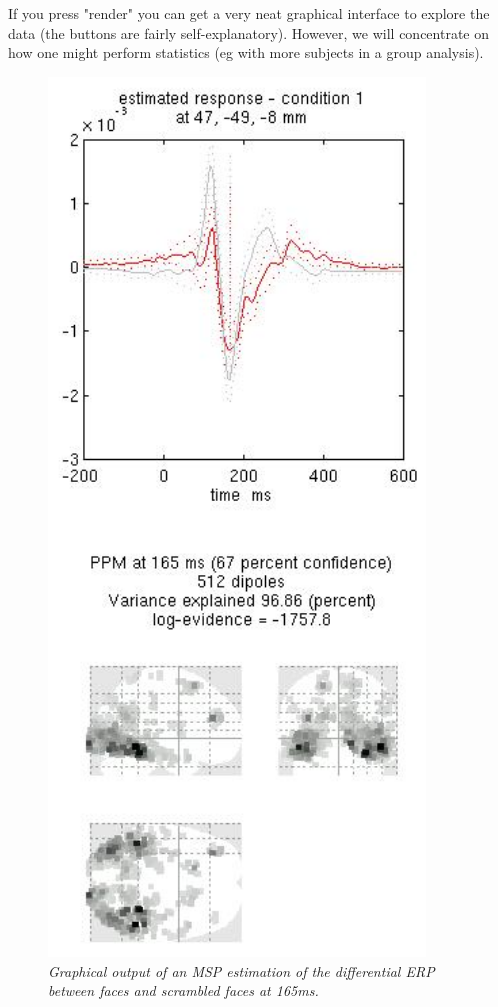 If you press "render" you can get a very neat graphical interface to explore the data (the buttons are fairly self-explanatory). However, we will concentrate on how one might perform statistics (eg with more subjects in a group analysis).


\begin{figure}
\begin{center}
\includegraphics[width=100mm]{multimodal/figures/figure_32_9}
\caption{\em Graphical output of an MSP estimation of the differential ERP between faces and scrambled faces at 165ms. \label{fig_32_9}}
\end{center}
\end{figure}

